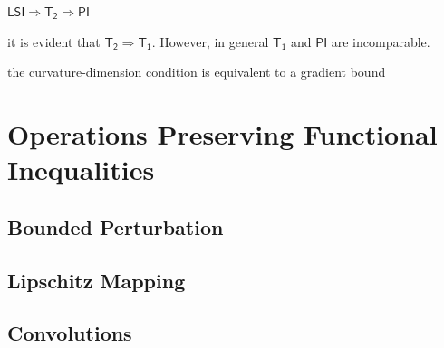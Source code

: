 $\mathsf{LSI} \Rightarrow \mathsf{T_2}\Rightarrow \mathsf{PI}$ 

it is evident that $\mathsf{T_2}\Rightarrow \mathsf{T_1}$. However, in general $\mathsf{T_1}$ and $\mathsf{PI}$ are incomparable.



the curvature-dimension condition is equivalent to a gradient bound

\section{Operations Preserving Functional Inequalities}

\subsection{Bounded Perturbation}



\subsection{Lipschitz Mapping}


\begin{corollary}
    
\end{corollary}

\subsection{Convolutions}


